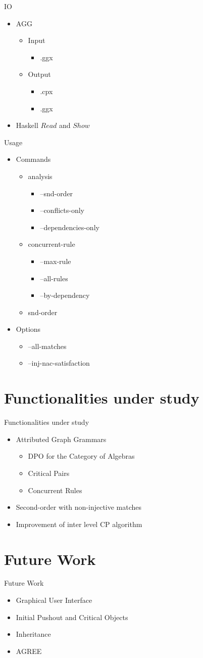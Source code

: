 \documentclass[xcolor=dvipsnames,pdf,11pt,handout]{beamer}
\newcommand{\bi}{\begin{itemize}}
\newcommand{\ei}{\end{itemize}}
\newcommand{\tm}{\item}
\begin{document}
\begin{frame}{IO}{}

\bi
\tm AGG
\bi
\tm Input
\bi
\tm .ggx
\ei
\ei
\bi
\tm Output
\bi
\tm .cpx
\tm .ggx
\ei
\ei
\tm Haskell $Read$ and $Show$ 
\ei

\end{frame}

\begin{frame}{Usage}{}

\bi
\tm Commands
\bi
\tm analysis
\bi
\tm --snd-order
\tm --conflicts-only
\tm --dependencies-only
\ei
\tm concurrent-rule
\bi
\tm --max-rule
\tm --all-rules
\tm --by-dependency
\ei
\tm snd-order
\ei
\tm Options
\bi
\tm --all-matches
\tm --inj-nac-satisfaction
\ei
\ei

\end{frame}

\section{Functionalities under study}

\begin{frame}[fragile]{Functionalities under study}{}

\bi
\tm Attributed Graph Grammars
\bi
\tm DPO for the Category of Algebras
\tm Critical Pairs
\tm Concurrent Rules
\ei
\tm Second-order with non-injective matches
\tm Improvement of inter level CP algorithm
\ei

\end{frame}

\section{Future Work}

\begin{frame}[fragile]{Future Work}{}

\bi
\tm Graphical User Interface
\tm Initial Pushout and Critical Objects
\tm Inheritance
\tm AGREE
\ei

\end{frame}
\end{document}
